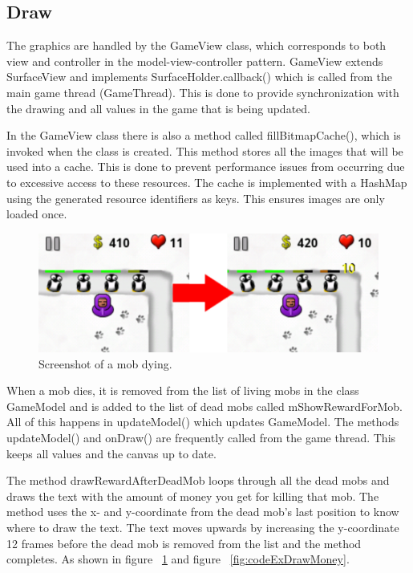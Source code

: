 \subsection{Draw}

The graphics are handled by the GameView class, which corresponds to both view and controller in the model-view-controller pattern. GameView extends SurfaceView and implements SurfaceHolder.callback() which is called from the main game thread (GameThread). This is done to provide synchronization with the drawing and all values in the game that is being updated. 

In the GameView class there is also a method called fillBitmapCache(), which is invoked when the class is created. This method stores all the images that will be used into a cache. This is done to prevent performance issues from occurring due to excessive access to these resources. The cache is implemented with a HashMap using the generated resource identifiers as keys. This ensures images are only loaded once.

\begin{figure}[here]
\begin{center}
\includegraphics[scale=1]{pics/chapters/chapter4/showmoney}
\end{center}
\caption{Screenshot of a mob dying.}
\label{fig:dyingMob}
\end{figure}

When a mob dies, it is removed from the list of living mobs in the class GameModel and is added to the list of dead mobs called mShowRewardForMob. All of this happens in updateModel() which updates GameModel. The methods updateModel() and onDraw() are frequently called from the game thread. This keeps all values and the canvas up to date.

The method drawRewardAfterDeadMob loops through all the dead mobs and draws the text with the amount of money you get for killing that mob. The method uses the x- and y-coordinate from the dead mob's last position to know where to draw the text. The text moves upwards by increasing the y-coordinate 12 frames before the dead mob is removed from the list and the method completes. As shown in figure ~\ref{fig:dyingMob} and figure ~\ref{fig:codeExDrawMoney}.

